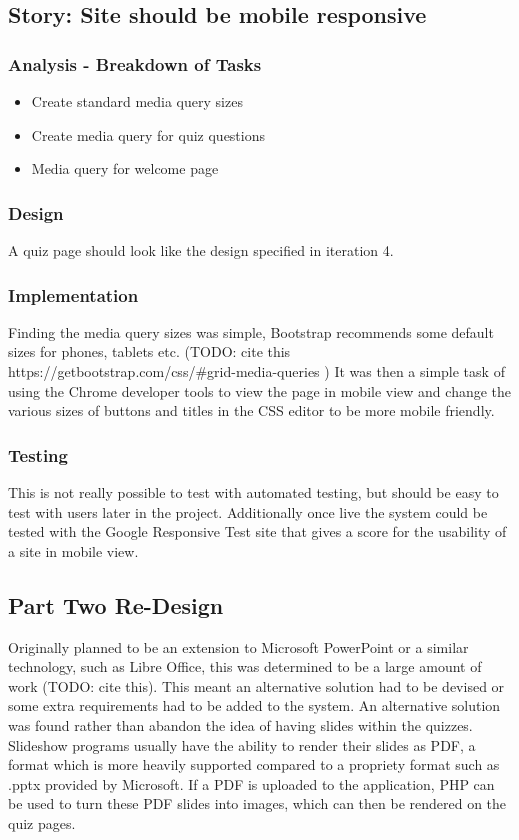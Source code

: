 \subsection{Story: Site should be mobile responsive}
\subsubsection{Analysis - Breakdown of Tasks}
\begin{itemize}
	\item Create standard media query sizes
	\item Create media query for quiz questions
	\item Media query for welcome page
\end{itemize}
\subsubsection{Design}
A quiz page should look like the design specified in iteration 4.
\subsubsection{Implementation}
Finding the media query sizes was simple, Bootstrap recommends some default sizes for phones, tablets etc. (TODO: cite this https://getbootstrap.com/css/\#grid-media-queries ) It was then a simple task of using the Chrome developer tools to view the page in mobile view and change the various sizes of buttons and titles in the CSS editor to be more mobile friendly.
\subsubsection{Testing}
This is not really possible to test with automated testing, but should be easy to test with users later in the project. Additionally once live the system could be tested with the Google Responsive Test site that gives a score for the usability of a site in mobile view.
\newpage

\subsection{Part Two Re-Design}
Originally planned to be an extension to Microsoft PowerPoint or a similar technology, such as Libre Office, this was determined to be a large amount of work (TODO: cite this). This meant an alternative solution had to be devised or some extra requirements had to be added to the system. An alternative solution was found rather than abandon the idea of having slides within the quizzes. Slideshow programs usually have the ability to render their slides as PDF, a format which is more heavily supported compared to a propriety format such as .pptx provided by Microsoft. If a PDF is uploaded to the application, PHP can be used to turn these PDF slides into images, which can then be rendered on the quiz pages.


